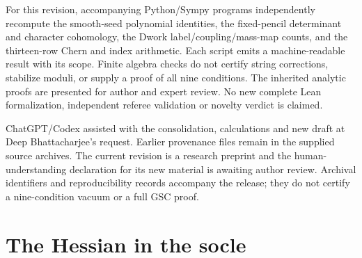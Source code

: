 For this revision, accompanying Python/Sympy programs independently
recompute the smooth-seed polynomial identities, the fixed-pencil
determinant and character cohomology, the Dwork label/coupling/mass-map
counts, and the thirteen-row Chern and index arithmetic.
Each script emits a machine-readable result with its scope.
Finite algebra checks do not certify string corrections, stabilize moduli,
or supply a proof of all nine conditions. The inherited analytic proofs
are presented for author and expert review. No new complete Lean
formalization, independent referee validation or novelty verdict is claimed.

ChatGPT/Codex assisted with the consolidation, calculations and new draft
at Deep Bhattacharjee's request. Earlier
provenance files remain in the supplied source archives. The current
revision is a research preprint and the human-understanding declaration for
its new material is awaiting author review. Archival identifiers and
reproducibility records accompany the release; they do not certify a
nine-condition vacuum or a full GSC proof.

\appendix


\section{The Hessian in the socle}\label{app:hessian}

